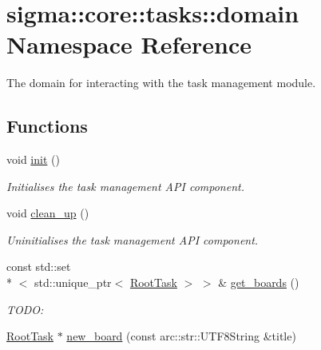 \hypertarget{namespacesigma_1_1core_1_1tasks_1_1domain}{\section{sigma\-:\-:core\-:\-:tasks\-:\-:domain Namespace Reference}
\label{namespacesigma_1_1core_1_1tasks_1_1domain}
}


The domain for interacting with the task management module.  


\subsection*{Functions}
\begin{DoxyCompactItemize}
\item 
void \hyperlink{namespacesigma_1_1core_1_1tasks_1_1domain_a1c9e74f15ced5d6050449521f089d293}{init} ()
\begin{DoxyCompactList}\small\item\em Initialises the task management A\-P\-I component. \end{DoxyCompactList}\item 
void \hyperlink{namespacesigma_1_1core_1_1tasks_1_1domain_a5133e92ea740e153728af3fd8d872d36}{clean\-\_\-up} ()
\begin{DoxyCompactList}\small\item\em Uninitialises the task management A\-P\-I component. \end{DoxyCompactList}\item 
\hypertarget{namespacesigma_1_1core_1_1tasks_1_1domain_ae85ad90e7ee1bf783a0da97bb553f93a}{const std\-::set\\*
$<$ std\-::unique\-\_\-ptr$<$ \hyperlink{classsigma_1_1core_1_1tasks_1_1_root_task}{Root\-Task} $>$ $>$ \& \hyperlink{namespacesigma_1_1core_1_1tasks_1_1domain_ae85ad90e7ee1bf783a0da97bb553f93a}{get\-\_\-boards} ()}\label{namespacesigma_1_1core_1_1tasks_1_1domain_ae85ad90e7ee1bf783a0da97bb553f93a}

\begin{DoxyCompactList}\small\item\em T\-O\-D\-O\-: \end{DoxyCompactList}\item 
\hypertarget{namespacesigma_1_1core_1_1tasks_1_1domain_ad580ee5a60c4d885fea6fecff72fcf8d}{\hyperlink{classsigma_1_1core_1_1tasks_1_1_root_task}{Root\-Task} $\ast$ \hyperlink{namespacesigma_1_1core_1_1tasks_1_1domain_ad580ee5a60c4d885fea6fecff72fcf8d}{new\-\_\-board} (const arc\-::str\-::\-U\-T\-F8\-String \&title)}\label{namespacesigma_1_1core_1_1tasks_1_1domain_ad580ee5a60c4d885fea6fecff72fcf8d}


\end{DoxyCompactItemize}
